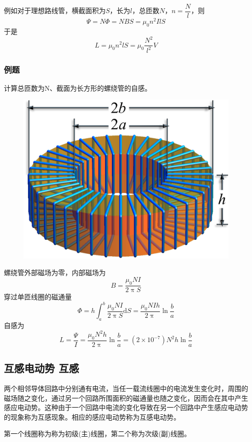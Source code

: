\documentclass[12pt]{article}
\newcommand{\rmd}{\mathrm{d}}
\begin{document}
例如对于理想路线管，横截面积为\(S\)，长为\(l\)，总匝数\(N\)，\(n = \dfrac{N}{l}\)，则
\begin{equation}
    \varPsi = N \varPhi = NBS = \mu_0 n^2 I l S
\end{equation}
于是
\begin{equation}
    L = \mu_0 n^2 l S = \mu_0 \frac{N^2}{l^2} V
\end{equation}

\subsubsection{例题}

计算总匝数为N、截面为长方形的螺绕管的自感。

\begin{figure}[!h]
    \centering
    \includegraphics[width = .25\textwidth]{graphics/自感例题.png}
\end{figure}

螺绕管外部磁场为零，内部磁场为
\begin{equation}
    B = \frac{\mu_0 NI}{2\uppi S}
\end{equation}
穿过单匝线圈的磁通量
\begin{equation}
    \varPhi = h \int_{a}^{b} \frac{\mu_0 NI}{2\uppi S} \rmd S = \frac{\mu_0 NIh}{2\uppi} \ln \frac{b}{a}
\end{equation}
自感为
\begin{equation}
    L = \frac{\varPsi}{I} = \frac{\mu_0 N^2 h}{2 \uppi} \ln \frac{b}{a} = \left(2 \times 10^{-7}\right) N^2 h \ln \frac{b}{a}
\end{equation}

\subsection{互感电动势 \quad 互感}

两个相邻导体回路中分别通有电流，当任一载流线圈中的电流发生变化时，周围的磁场随之变化，通过另一个回路所围面积的磁通量也随之变化，因而会在其中产生感应电动势。这种由于一个回路中电流的变化导致在另一个回路中产生感应电动势的现象称为互感现象。相应的感应电动势称为互感电动势。

第一个线圈称为称为初级(主)线圈，第二个称为次级(副)线圈。
\end{document}
